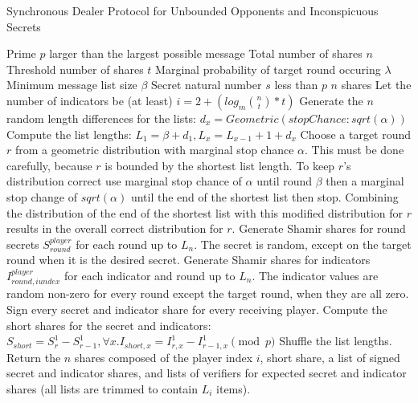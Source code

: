 \documentclass{dalcsthesis}
\begin{document}
\begin{algorithm}
  \caption{Synchronous Dealer Protocol for Unbounded Opponents and Inconspicuous Secrets}
  \label{alg:SB_Dealer}
  \begin{algorithmic}[1]
    \INPUT Prime $p$ larger than the largest possible message
    \INPUT Total number of shares $n$
    \INPUT Threshold number of shares $t$
    \INPUT Marginal probability of target round occuring $\lambda$
    \INPUT Minimum message list size $\beta$
    \INPUT Secret natural number $s$ less than $p$
    \OUTPUT $n$ shares
    \STATE Let the number of indicators be (at least) $i = 2 + (log_m {n \choose t}*t)$
    \STATE Generate the $n$ random length differences for the lists: $d_x = Geometric(stopChance: sqrt(\alpha))$
    \STATE Compute the list lengths: $L_1 = \beta + d_1, L_x = L_{x-1} + 1 + d_x$
    \STATE Choose a target round $r$ from a geometric distribution with marginal stop chance $\alpha$. This must be done carefully, because $r$ is bounded by the shortest list length. To keep $r$'s distribution correct use marginal stop chance of $\alpha$ until round $\beta$ then a marginal stop change of $sqrt(\alpha)$ until the end of the shortest list then stop. Combining the distribution of the end of the shortest list with this modified distribution for $r$ results in the overall correct distribution for $r$.
    \STATE Generate Shamir shares for round secrets $S_{round}^{player}$ for each round up to $L_{n}$. The secret is random, except on the target round when it is the desired secret.
    \STATE Generate Shamir shares for indicators $I_{round,iundex}^{player}$ for each indicator and round up to $L_{n}$. The indicator values are random non-zero for every round except the target round, when they are all zero.
    \STATE Sign every secret and indicator share for every receiving player.
    \STATE Compute the short shares for the secret and indicators: $S_{short} = S_r^1 - S_{r-1}^1, \forall x . I_{short,x} = I_{r,x}^1 - I_{r-1,x}^1 \pmod{p}$
    \STATE Shuffle the list lengths.
    \STATE Return the $n$ shares composed of the player index $i$, short share, a list of signed secret and indicator shares, and lists of verifiers for expected secret and indicator shares (all lists are trimmed to contain $L_i$ items).
  \end{algorithmic}
\end{algorithm}
\end{document}
